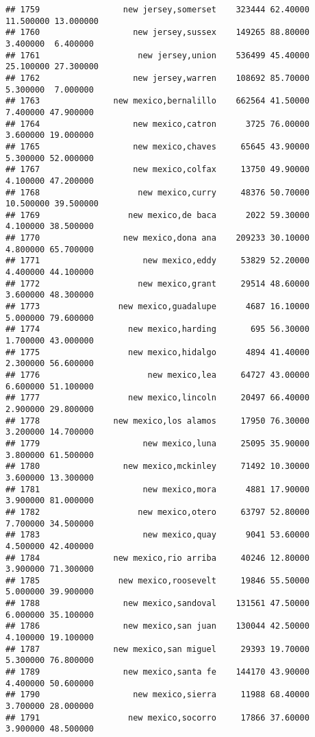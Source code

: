 \documentclass[
]{article}
\begin{document}
\begin{verbatim}
## 1759                 new jersey,somerset    323444 62.40000 11.500000 13.000000
## 1760                   new jersey,sussex    149265 88.80000  3.400000  6.400000
## 1761                    new jersey,union    536499 45.40000 25.100000 27.300000
## 1762                   new jersey,warren    108692 85.70000  5.300000  7.000000
## 1763               new mexico,bernalillo    662564 41.50000  7.400000 47.900000
## 1764                   new mexico,catron      3725 76.00000  3.600000 19.000000
## 1765                   new mexico,chaves     65645 43.90000  5.300000 52.000000
## 1767                   new mexico,colfax     13750 49.90000  4.100000 47.200000
## 1768                    new mexico,curry     48376 50.70000 10.500000 39.500000
## 1769                  new mexico,de baca      2022 59.30000  4.100000 38.500000
## 1770                 new mexico,dona ana    209233 30.10000  4.800000 65.700000
## 1771                     new mexico,eddy     53829 52.20000  4.400000 44.100000
## 1772                    new mexico,grant     29514 48.60000  3.600000 48.300000
## 1773                new mexico,guadalupe      4687 16.10000  5.000000 79.600000
## 1774                  new mexico,harding       695 56.30000  1.700000 43.000000
## 1775                  new mexico,hidalgo      4894 41.40000  2.300000 56.600000
## 1776                      new mexico,lea     64727 43.00000  6.600000 51.100000
## 1777                  new mexico,lincoln     20497 66.40000  2.900000 29.800000
## 1778               new mexico,los alamos     17950 76.30000  3.200000 14.700000
## 1779                     new mexico,luna     25095 35.90000  3.800000 61.500000
## 1780                 new mexico,mckinley     71492 10.30000  3.600000 13.300000
## 1781                     new mexico,mora      4881 17.90000  3.900000 81.000000
## 1782                    new mexico,otero     63797 52.80000  7.700000 34.500000
## 1783                     new mexico,quay      9041 53.60000  4.500000 42.400000
## 1784               new mexico,rio arriba     40246 12.80000  3.900000 71.300000
## 1785                new mexico,roosevelt     19846 55.50000  5.000000 39.900000
## 1788                 new mexico,sandoval    131561 47.50000  6.000000 35.100000
## 1786                 new mexico,san juan    130044 42.50000  4.100000 19.100000
## 1787               new mexico,san miguel     29393 19.70000  5.300000 76.800000
## 1789                 new mexico,santa fe    144170 43.90000  4.400000 50.600000
## 1790                   new mexico,sierra     11988 68.40000  3.700000 28.000000
## 1791                  new mexico,socorro     17866 37.60000  3.900000 48.500000

\end{verbatim}
\end{document}
